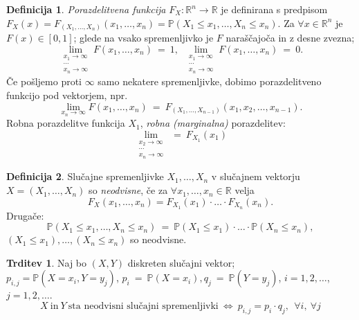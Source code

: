 \documentclass[11pt]{article}
\theoremstyle{definition}
\newtheorem{definicija}{Definicija}[section]
\theoremstyle{definition}
\newtheorem{trditev}{Trditev}[section]
\theoremstyle{definition}
\begin{document}
\begin{definicija}

\textit{Porazdelitvena funkcija} $F_X: \mathbb{R}^n \rightarrow \mathbb{R}$ je definirana s predpisom $F_X(x) = F_{(X_1, \ldots, X_n)}(x_1, \ldots, x_n) = \mathbb{P}(X_1 \leq x_1, \ldots, X_n \leq x_n)$. Za $\forall x \in \mathbb{R}^n$ je $F(x) \in [0, 1]$; glede na vsako spremenljivko je $F$ naraščajoča in z desne zvezna;
$$\lim_{\substack{x_1 \rightarrow \infty \\ \cdots \\ x_n \rightarrow \infty}} F(x_1, \ldots, x_n) ~=~ 1, ~~\lim_{\substack{x_1 \rightarrow \infty \\ \cdots \\ x_n \rightarrow \infty}} F(x_1, \ldots, x_n) ~=~ 0.$$
Če pošljemo proti $\infty$ samo nekatere spremenljivke, dobimo porazdelitveno funkcijo pod vektorjem, npr.
$$\lim_{x_n \rightarrow \infty} F(x_1, \ldots, x_n) ~=~ F_{(X_1, \ldots, X_{n-1})}(x_1, x_2, \ldots, x_{n-1}).$$
Robna porazdelitve funkcija $X_1$, \textit{robna (marginalna)} porazdelitev:
$$\lim_{\substack{x_2 \rightarrow \infty \\ \cdots \\ x_n \rightarrow \infty}} ~=~ F_{X_1}(x_1)$$

\end{definicija}
\vspace{0.5cm}

\begin{definicija}

Slučajne spremenljivke $X_1, \ldots, X_n$ v slučajnem vektorju $X = (X_1, \ldots, X_n)$ so \textit{neodvisne}, če za $\forall x_1, \ldots, x_n \in \mathbb{R}$ velja 
$$F_X(x_1, \ldots, x_n) = F_{X_1}(x_1) \cdot \ldots \cdot F_{X_n}(x_n).$$
Drugače:
$$\mathbb{P}(X_1 \leq x_1, \ldots, X_n \leq x_n) ~=~ \mathbb{P}(X_1 \leq x_1) \cdot \ldots \cdot \mathbb{P}(X_n \leq x_n),$$ 
$(X_1 \leq x_1), \ldots, (X_n \leq x_n)$ so neodvisne.


\end{definicija}
\vspace{0.5cm}

\begin{trditev}

Naj bo $(X, Y)$ diskreten slučajni vektor; \\$p_{i,j} = \mathbb{P}(X = x_i, Y = y_j)$, $p_i ~=~ \mathbb{P}(X = x_i), q_j ~=~ \mathbb{P}(Y = y_j)$, $i = 1, 2, \ldots$, $j = 1, 2, \ldots$.
$$X ~\text{in}~ Y ~\text{sta neodvisni slučajni spremenljivki}~ \Leftrightarrow ~p_{i,j} = p_i \cdot q_j, ~~\forall i, ~\forall j $$

\end{trditev}
\vspace{0.5cm}
\end{document}
